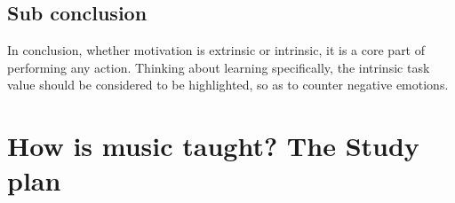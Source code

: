 \subsection*{Sub conclusion}
In conclusion, whether motivation is extrinsic or intrinsic, it is a core part of performing any action. Thinking about learning specifically, the intrinsic task value should be considered to be highlighted, so as to counter negative emotions.

\section{How is music taught? The Study plan}

